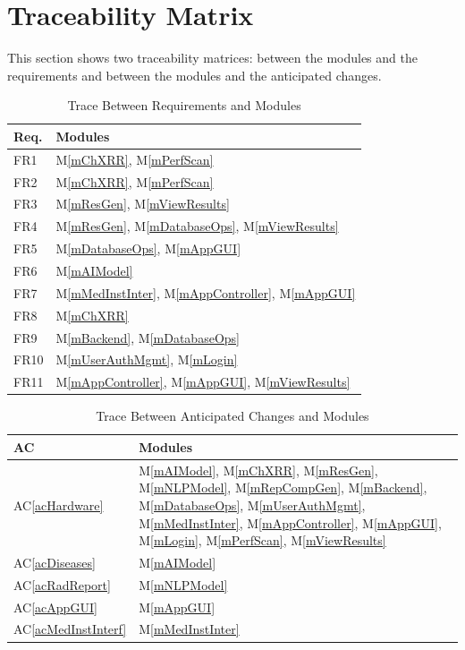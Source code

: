 \documentclass[12pt, titlepage]{article}
\newcommand{\acref}[1]{AC\ref{#1}}
\newcommand{\mref}[1]{M\ref{#1}}
\begin{document}
\section{Traceability Matrix} \label{SecTM}

This section shows two traceability matrices: between the modules and the
requirements and between the modules and the anticipated changes.

\begin{table}[H]
\centering
\begin{tabular}{p{} p{}}
\toprule
\textbf{Req.} & \textbf{Modules} \\
\midrule
FR1 & \mref{mChXRR}, \mref{mPerfScan} \\
FR2 & \mref{mChXRR}, \mref{mPerfScan} \\
FR3 & \mref{mResGen}, \mref{mViewResults} \\
FR4 & \mref{mResGen}, \mref{mDatabaseOps}, \mref{mViewResults} \\
FR5 & \mref{mDatabaseOps}, \mref{mAppGUI} \\
FR6 & \mref{mAIModel} \\
FR7 & \mref{mMedInstInter}, \mref{mAppController}, \mref{mAppGUI} \\
FR8 & \mref{mChXRR} \\
FR9 & \mref{mBackend}, \mref{mDatabaseOps} \\
FR10 & \mref{mUserAuthMgmt}, \mref{mLogin} \\
FR11 & \mref{mAppController}, \mref{mAppGUI}, \mref{mViewResults} \\
\bottomrule
\end{tabular}
\caption{Trace Between Requirements and Modules}
\label{TblRT}
\end{table}

\begin{table}[H]
\centering
\begin{tabular}{p{} p{}}
\toprule
\textbf{AC} & \textbf{Modules} \\
\midrule
\acref{acHardware} & \mref{mAIModel}, \mref{mChXRR}, \mref{mResGen},
  \mref{mNLPModel}, \mref{mRepCompGen}, \mref{mBackend}, \mref{mDatabaseOps},
  \mref{mUserAuthMgmt}, \mref{mMedInstInter}, \mref{mAppController},
  \mref{mAppGUI}, \mref{mLogin}, \mref{mPerfScan}, \mref{mViewResults} \\
\acref{acDiseases} & \mref{mAIModel} \\
\acref{acRadReport} & \mref{mNLPModel} \\
\acref{acAppGUI} & \mref{mAppGUI} \\
\acref{acMedInstInterf} & \mref{mMedInstInter} \\
\bottomrule
\end{tabular}
\caption{Trace Between Anticipated Changes and Modules}
\label{TblACT}
\end{table}
\end{document}

